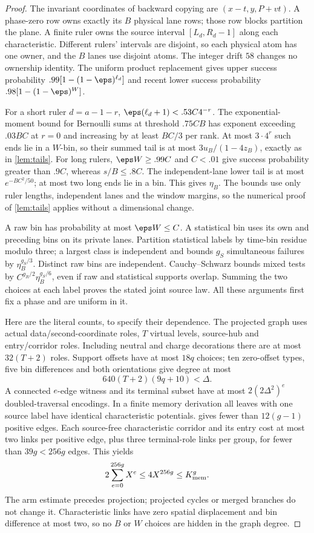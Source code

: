 \begin{proof}
The invariant coordinates of backward copying are $(x-t,y,P+vt)$. A phase-zero row owns exactly its $B$ physical lane rows; those row blocks partition the plane. A finite ruler owns the source interval $[L_d,R_d-1]$ along each characteristic. Different rulers' intervals are disjoint, so each physical atom has one owner, and the $B$ lanes use disjoint atoms. The integer drift $58$ changes no ownership identity. The uniform product replacement gives upper success probability $.99[1-(1-\eps)^{\ell_d}]$ and recent lower success probability $.98[1-(1-\eps)^W]$.

For a short ruler $d=a-1-r$, $\eps(\ell_d+1)<.53C4^{-r}$. The exponential-moment bound for Bernoulli sums at threshold $.75CB$ has exponent exceeding $.03BC$ at $r=0$ and increasing by at least $BC/3$ per rank. At most $3\cdot4^r$ such ends lie in a $W$-bin, so their summed tail is at most $3u_B/(1-4z_B)$, exactly as in \cref{lem:tails}. For long rulers, $\eps W\ge.99C$ and $C<.01$ give success probability greater than $.9C$, whereas $s/B\le.8C$. The independent-lane lower tail is at most $e^{-BC^2/50}$; at most two long ends lie in a bin. This gives $\eta_B$. The bounds use only ruler lengths, independent lanes and the window margins, so the numerical proof of \cref{lem:tails} applies without a dimensional change.

A raw bin has probability at most $\eps W\le C$. A statistical bin uses its own and preceding bins on its private lanes. Partition statistical labels by time-bin residue modulo three; a largest class is independent and bounds $g_S$ simultaneous failures by $\eta_B^{g_S/3}$. Distinct raw bins are independent. Cauchy--Schwarz bounds mixed tests by $C^{g_R/2}\eta_B^{g_S/6}$, even if raw and statistical supports overlap. Summing the two choices at each label proves the stated joint source law. All these arguments first fix a phase and are uniform in it.

Here are the literal counts, to specify their dependence. The projected graph uses actual data/second-coordinate roles, $T$ virtual levels, source-hub and entry/corridor roles. Including neutral and charge decorations there are at most $32(T+2)$ roles. Support offsets have at most $18q$ choices; ten zero-offset types, five bin differences and both orientations give degree at most
\[
 640(T+2)(9q+10)<\Delta.
\]
A connected $e$-edge witness and its terminal subset have at most $2(2\Delta^2)^e$ doubled-traversal encodings. In a finite memory derivation all leaves with one source label have identical characteristic potentials.  gives fewer than $12(g-1)$ positive edges. Each source-free characteristic corridor and its entry cost at most two links per positive edge, plus three terminal-role links per group, for fewer than $39g<256g$ edges. This yields
\[
 2\sum_{e=0}^{256g}X^e\le4X^{256g}\le K_{\rm mem}^g.
\]
The arm estimate precedes projection; projected cycles or merged branches do not change it. Characteristic links have zero spatial displacement and bin difference at most two, so no $B$ or $W$ choices are hidden in the graph degree.


\end{proof}
